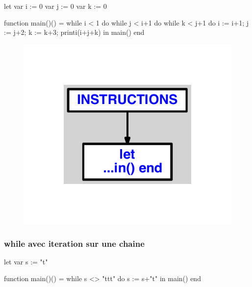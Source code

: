 \documentclass{article}
\begin{document}
\begin{verbatimtab}
let
	var i := 0
	var j := 0
	var k := 0

	function main()() =
		while i < 1 do
			while j < i+1 do
				while k < j+1 do
					i := i+1;
					j := j+2;
					k := k+3;
					printi(i+j+k)
in main() end
\end{verbatimtab}
\begin{figure}[H]\centering\includegraphics[max width=\textwidth]{ast/ast_330.pdf}\end{figure}\subsubsection{while avec iteration sur une chaine}
\begin{verbatimtab}
let
	var s := "t"

	function main()() =
		while s <> "ttt" do
			s := s+"t"
in main() end
\end{verbatimtab}
\end{document}
